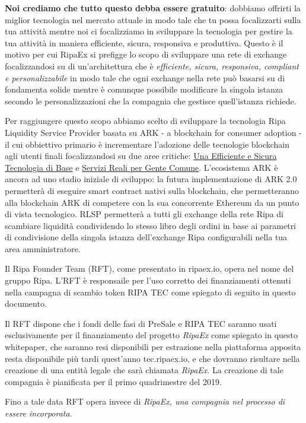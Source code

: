 \documentclass[11pt,fleqn]{book} %
\begin{document}
\textbf{Noi crediamo che tutto questo debba essere gratuito}: dobbiamo offrirti la miglior tecnologia nel mercato attuale in modo tale che tu 
possa focalizzarti sulla tua attività mentre noi ci focalizziamo in sviluppare la tecnologia per gestire la tua attività in maniera efficiente, 
sicura, responsiva e produttiva. Questo è il motivo per cui RipaEx si prefigge lo scopo di sviluppare una rete di exchange
focalizzandosi su di un'architettura che è \textit{efficiente, sicura, responsiva, compliant e personalizzabile} in modo tale che ogni exchange
nella rete può basarsi su di fondamenta solide mentre è comunque possibile modificare la singola istanza secondo le personalizzazioni 
che la compagnia che gestisce quell'istanza richiede.

Per raggiungere questo scopo abbiamo scelto di sviluppare la tecnologia Ripa Liquidity Service Provider basata su ARK - a blockchain for consumer adoption - 
il cui obbiettivo primario è incrementare l'adozione delle tecnologie blockchain agli utenti finali focalizzandosi su due aree critiche: 
\underline{Una Efficiente e Sicura Tecnologia di Base} e \underline{Servizi Reali per Gente Comune}. L'ecosistema ARK è ancora ad uno stadio
iniziale di sviluppo: la futura implementazione di ARK 2.0 permetterà di eseguire smart contract nativi sulla blockchain, che permetteranno
alla blockchain ARK di competere con la sua concorrente Ethereum da un punto di vista tecnologico. RLSP permetterà a tutti gli exchange della rete Ripa
di scambiare liquidità condividendo lo stesso libro degli ordini in base ai parametri di condivisione della singola istanza dell'exchange Ripa
configurabili nella tua area amministratore.

Il Ripa Founder Team (RFT), come presentato in ripaex.io, opera nel nome del gruppo Ripa. L'RFT è responsaile per l'uso corretto dei finanziamenti
ottenuti nella campagna di scambio token RIPA TEC come spiegato di seguito in questo documento.

Il RFT dispone che i fondi delle fasi di PreSale e RIPA TEC saranno usati esclusivamente per il finanziamento del progetto 
\emph{RipaEx} come spiegato in questo whitepaper, che saranno resi disponibili per estrazione nella piattaforma apposita resta disponibile
più tardi quest'anno tec.ripaex.io, e che dovranno risultare nella creazione di una entità legale che sarà chiamata \emph{RipaEx}. La creazione di tale 
compagnia è pianificata per il primo quadrimestre del 2019.

Fino a tale data RFT opera invece di \emph{RipaEx, una compagnia nel processo di essere incorporata}.
\end{document}
